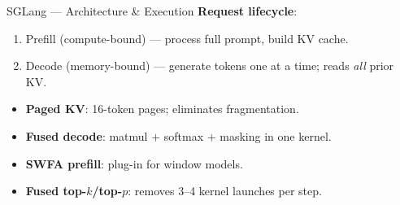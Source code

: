 \documentclass[10pt,aspectratio=169]{beamer}
\begin{document}
\begin{frame}{SGLang — Architecture \& Execution}
  \textbf{Request lifecycle}:
  \begin{enumerate}
    \item Prefill (compute-bound) — process full prompt, build KV
          cache.
    \item Decode (memory-bound) — generate tokens one at a time;
          reads \emph{all} prior KV.
  \end{enumerate}
  \vspace{1ex}
  \centering
  \vspace{1ex}

  \scriptsize
  \begin{itemize}
    \item \textbf{Paged KV}: 16-token pages; eliminates fragmentation.
    \item \textbf{Fused decode}: matmul $+$ softmax $+$ masking in one kernel.
    \item \textbf{SWFA prefill}: plug-in for window models.
    \item \textbf{Fused top-$k$/top-$p$}: removes 3--4 kernel launches per step.
  \end{itemize}
\end{frame}
\end{document}

